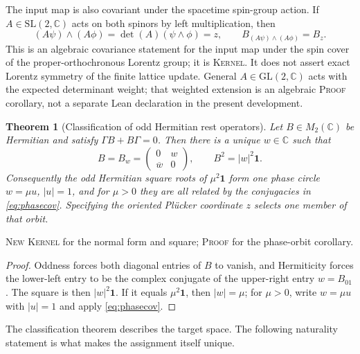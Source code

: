 \documentclass[11pt]{article}
\newcommand{\Kernel}{\textcolor{kernelcolor}{\textsc{Kernel}}}
\newcommand{\Human}{\textcolor{humanproofcolor}{\textsc{Proof}}}
\newcommand{\NewResult}{\textsc{New}}
\newcommand{\C}{\mathbb{C}}
\newcommand{\id}{\mathbf{1}}
\newtheorem{theorem}{Theorem}[section]
\begin{document}
The input map is also covariant under the spacetime spin-group action.  If
$A\in\mathrm{SL}(2,\C)$ acts on both spinors by left multiplication, then
\begin{equation}\label{eq:sl2cov}
 (A\psi)\wedge(A\phi)=\det(A)(\psi\wedge\phi)=z,
 \qquad
 B_{(A\psi)\wedge(A\phi)}=B_z.
\end{equation}
This is an algebraic covariance statement for the input map under the spin
cover of the proper-orthochronous Lorentz group; it is \Kernel{}.  It does not
assert exact Lorentz symmetry of the finite lattice update.  General
$A\in\mathrm{GL}(2,\C)$ acts with the expected determinant weight; that
weighted extension is an algebraic \Human{} corollary, not a separate Lean
declaration in the present development.

\begin{theorem}[Classification of odd Hermitian rest operators]
\label{thm:classification}
Let $B\in M_2(\C)$ be Hermitian and satisfy
$\Gamma B+B\Gamma=0$.  Then there is a unique $w\in\C$ such that
\begin{equation}
 B=B_w=\begin{pmatrix}0&w\\\overline w&0\end{pmatrix},
 \qquad
 B^2=|w|^2\id.
\end{equation}
Consequently the odd Hermitian square roots of $\mu^2\id$ form one phase
circle $w=\mu u$, $|u|=1$, and for $\mu>0$ they are all related by the
conjugacies in \eqref{eq:phasecov}.  Specifying the oriented Pl\"ucker
coordinate $z$ selects one member of that orbit.
\end{theorem}
\noindent\NewResult{} \Kernel{} for the normal form and square;
\Human{} for the phase-orbit corollary.

\begin{proof}
Oddness forces both diagonal entries of $B$ to vanish, and Hermiticity forces
the lower-left entry to be the complex conjugate of the upper-right entry
$w=B_{01}$.  The square is then $|w|^2\id$.  If it equals $\mu^2\id$, then
$|w|=\mu$; for $\mu>0$, write $w=\mu u$ with $|u|=1$ and apply
\eqref{eq:phasecov}.
\end{proof}

The classification theorem describes the target space.  The following
naturality statement is what makes the assignment itself unique.
\end{document}
